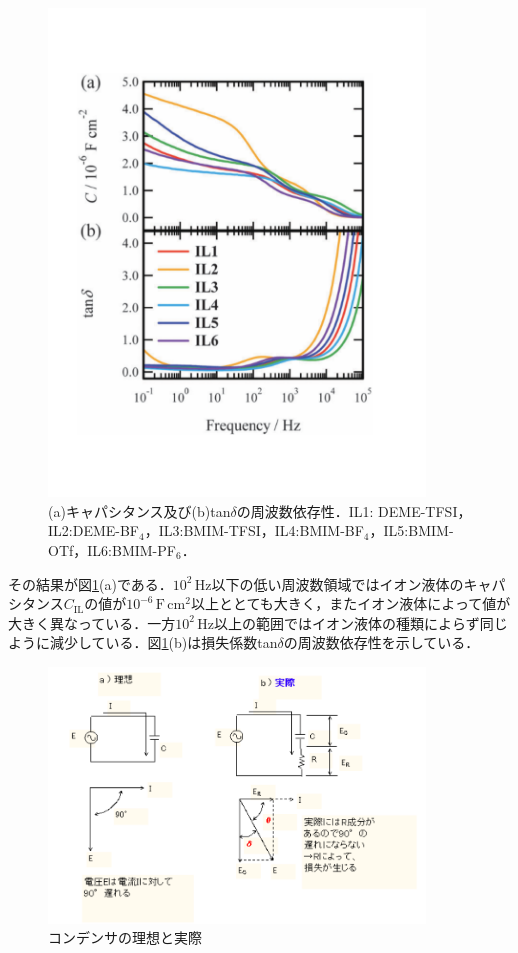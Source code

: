 \begin{figure}[t]
 \begin{center}
  \includegraphics[width=100mm]{images/ILcapacitance.pdf}
\end{center}
 \caption{(a)キャパシタンス及び(b)tan$\delta$の周波数依存性．IL1: DEME-TFSI，IL2:DEME-BF$_{4}$，IL3:BMIM-TFSI，IL4:BMIM-BF$_{4}$，IL5:BMIM-OTf，IL6:BMIM-PF$_{6}$．}
 \label{ILcapacitance}
\end{figure}

その結果が図\ref{ILcapacitance}(a)である．$10^{2}\,\mathrm{Hz}$以下の低い周波数領域ではイオン液体のキャパシタンス$C_{\mathrm{IL}}$の値が$10^{-6}\,\mathrm{F\,cm^{2}}$以上ととても大きく，またイオン液体によって値が大きく異なっている．一方$10^{2}\,\mathrm{Hz}$以上の範囲ではイオン液体の種類によらず同じように減少している．図\ref{ILcapacitance}(b)は損失係数tan$\delta$の周波数依存性を示している．

\begin{figure}[t]
 \begin{center}
  \includegraphics[width=100mm]{images/tandel.png}
\end{center}
 \caption{コンデンサの理想と実際}
 \label{tandel}
\end{figure}

